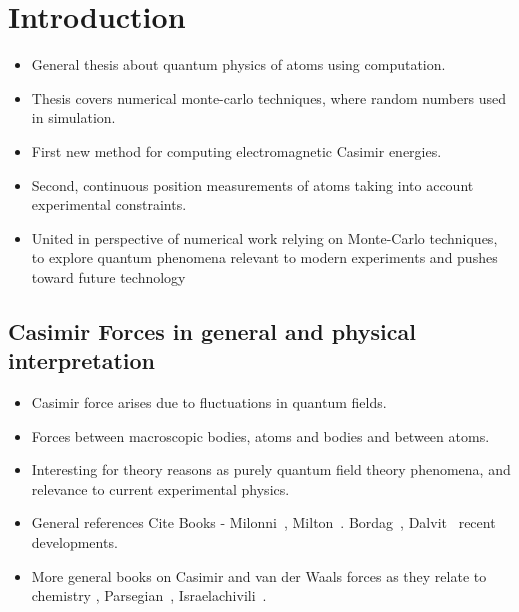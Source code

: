 \chapter{Introduction}



\begin{itemize}
\item General thesis about quantum physics of atoms using computation.  
\item Thesis covers numerical monte-carlo techniques, where random numbers used in simulation.
\item First new method for computing electromagnetic Casimir energies.
\item Second, continuous position measurements of atoms taking into account experimental constraints.  
\item United in perspective of numerical work relying on Monte-Carlo techniques, to explore quantum phenomena relevant to modern experiments and pushes toward future technology  
\end{itemize}



\section{Casimir Forces in general and physical interpretation}

\begin{itemize}
\item Casimir force arises due to fluctuations in quantum fields. 
\item Forces between macroscopic bodies, atoms and bodies and between atoms.  
\item Interesting for theory reasons as purely quantum field theory phenomena, and relevance to current experimental physics.  
\end{itemize}


\begin{itemize}
\item General references Cite Books - Milonni~\cite{Milonnibook1994}, Milton~\cite{Miltonbook2001}.  Bordag~\cite{Bordagbook2009}, Dalvit~\cite{Dalvitbook2011} recent developments.  
\item More general books on Casimir and van der Waals forces as they relate to chemistry , Parsegian~\cite{Parsegian2006}, Israelachivili~\cite{Israelachvili2011}.
\end{itemize}


